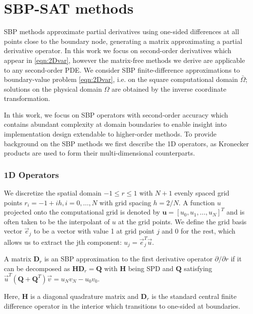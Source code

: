 \section{SBP-SAT methods}


SBP methods approximate partial derivatives using one-sided differences at all points close to the boundary node, generating a matrix approximating a partial derivative operator. In this work we focus on second-order derivatives which appear in \eqref{eqn:2Dvar}, however the matrix-free methods we derive are applicable to any second-order PDE. We consider SBP finite-difference approximations to boundary-value problem \eqref{eqn:2Dvar}, i.e. on the square computational domain $\bar\Omega$; solutions on the physical domain $\Omega$ are obtained by the inverse coordinate transformation.

In this work, we focus on SBP operators with second-order accuracy which contains abundant complexity at domain boundaries to enable insight into implementation design extendable to higher-order methods.  To provide background on the SBP methods we first describe the 1D operators, as Kronecker products are used to form their multi-dimensional counterparts. 


\subsubsection{1D Operators}

We discretize the spatial domain $-1\leq r \leq 1$ with $N+1$ evenly spaced grid points $r_i = -1 + ih, i=0, \dots, N$ with grid spacing $h = 2/N$. A function $u$ projected onto the computational grid is denoted by $\boldsymbol{u} = [u_0, u_1, \dots, u_N]^T$ and is often taken to be the interpolant of $u$ at the grid points. We define the grid basis vector $\vec{e}_j$ to be a vector with value 1 at grid point $j$ and 0 for the rest, which allows us to extract the jth component: $u_j = \vec{e}_j^T\vec{u}$.  

\begin{definition}
  A matrix $\boldsymbol{D}_{r}$ is an SBP approximation to the first derivative operator $\partial /\partial
  r$ if it can be decomposed as $\boldsymbol{H}\boldsymbol{D}_{r} = \boldsymbol{Q}$ with $\boldsymbol{H}$ being SPD and $\boldsymbol{Q}$ satisfying $\vec{u}^{T}(\boldsymbol{Q} +
  \boldsymbol{Q}^{T})\vec{v} = u_{N}v_{N} - u_{0}v_{0}$.
\end{definition}
%
\noindent Here, $\boldsymbol{H}$ is a diagonal quadrature matrix and  $\boldsymbol{D}_{r}$ is the standard central finite difference operator in the interior which transitions to one-sided at boundaries. 

